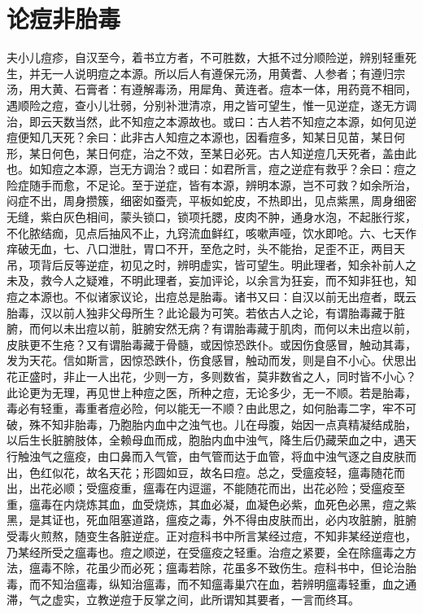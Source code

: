 \documentclass[a4paper,12pt,UTF8,twoside]{ctexbook}
\begin{document}
	\chapter{论痘非胎毒}
	夫小儿痘疹，自汉至今，着书立方者，不可胜数，大抵不过分顺险逆，辨别轻重死生，并无一人说明痘之本源。所以后人有遵保元汤，用黄耆、人参者；有遵归宗汤，用大黄、石膏者：有遵解毒汤，用犀角、黄连者。痘本一体，用药竟不相同，遇顺险之痘，查小儿壮弱，分别补泄清凉，用之皆可望生，惟一见逆症，遂无方调治，即云天数当然，此不知痘之本源故也。或曰：古人若不知痘之本源，如何见逆痘便知几天死？余曰：此非古人知痘之本源也，因看痘多，知某日见苗，某日何形，某日何色，某日何症，治之不效，至某日必死。古人知逆痘几天死者，盖由此也。如知痘之本源，岂无方调治？或曰：如君所言，痘之逆症有救乎？余曰：痘之险症随手而愈，不足论。至于逆症，皆有本源，辨明本源，岂不可救？如余所治，闷症不出，周身攒簇，细密如蚕壳，平板如蛇皮，不热即出，见点紫黑，周身细密无缝，紫白灰色相间，蒙头锁口，锁项托腮，皮肉不肿，通身水泡，不起胀行浆，不化脓结痂，见点后抽风不止，九窍流血鲜红，咳嗽声哑，饮水即呛。六、七天作痒破无血，七、八口泄肚，胃口不开，至危之时，头不能抬，足歪不正，两目天吊，项背后反等逆症，初见之时，辨明虚实，皆可望生。明此理者，知余补前人之未及，救今人之疑难，不明此理者，妄加评论，以余言为狂妄，而不知非狂也，知痘之本源也。不似诸家议论，出痘总是胎毒。诸书又曰：自汉以前无出痘者，既云胎毒，汉以前人独非父母所生？此论最为可笑。若依古人之论，有谓胎毒藏于脏腑，而何以未出痘以前，脏腑安然无病？有谓胎毒藏于肌肉，而何以未出痘以前，皮肤更不生疮？又有谓胎毒藏于骨髓，或因惊恐跌仆。或因伤食感冒，触动其毒，发为天花。信如斯言，因惊恐跌仆，伤食感冒，触动而发，则是自不小心。伏思出花正盛时，非止一人出花，少则一方，多则数省，莫非数省之人，同时皆不小心？此论更为无理，再见世上种痘之医，所种之痘，无论多少，无一不顺。若是胎毒，毒必有轻重，毒重者痘必险，何以能无一不顺？由此思之，如何胎毒二字，牢不可破，殊不知非胎毒，乃胞胎内血中之浊气也。儿在母腹，始因一点真精凝结成胎，以后生长脏腑肢体，全赖母血而成，胞胎内血中浊气，降生后仍藏荣血之中，遇天行触浊气之瘟疫，由口鼻而入气管，由气管而达于血管，将血中浊气逐之自皮肤而出，色红似花，故名天花；形圆如豆，故名曰痘。总之，受瘟疫轻，瘟毒随花而出，出花必顺；受瘟疫重，瘟毒在内逗遛，不能随花而出，出花必险；受瘟疫至重，瘟毒在内烧炼其血，血受烧炼，其血必凝，血凝色必紫，血死色必黑，痘之紫黑，是其证也，死血阻塞道路，瘟疫之毒，外不得由皮肤而出，必内攻脏腑，脏腑受毒火煎熬，随变生各脏逆症。正对痘科书中所言某经过痘，不知非某经逆痘也，乃某经所受之瘟毒也。痘之顺逆，在受瘟疫之轻重。治痘之紧要，全在除瘟毒之方法，瘟毒不除，花虽少而必死；瘟毒若除，花虽多不致伤生。痘科书中，但论治胎毒，而不知治瘟毒，纵知治瘟毒，而不知瘟毒巢穴在血，若辨明瘟毒轻重，血之通滞，气之虚实，立教逆痘于反掌之间，此所谓知其要者，一言而终耳。
\end{document}
